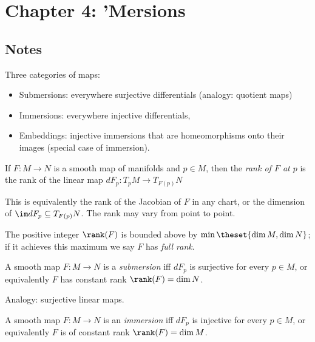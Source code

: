 \hypertarget{chapter-4-mersions}{%
\section{Chapter 4: 'Mersions}\label{chapter-4-mersions}}

\hypertarget{notes-2}{%
\subsection{Notes}\label{notes-2}}

Three categories of maps:

\begin{itemize}
\tightlist
\item
  Submersions: everywhere surjective differentials (analogy: quotient
  maps)
\item
  Immersions: everywhere injective differentials,
\item
  Embeddings: injective immersions that are homeomorphisms onto their
  images (special case of immersion).
\end{itemize}

\begin{definition}[Rank]

If \(F:M \to N\) is a smooth map of manifolds and \(p\in M\), then the
\emph{rank of \(F\) at \(p\)} is the rank of the linear map
\(dF_p: T_p M \to T_{F(p)} N\)

\end{definition}

This is equivalently the rank of the Jacobian of \(F\) in any chart, or
the dimension of \(\im dF_p \subseteq T_{F(p)}N\). The rank may vary
from point to point.

The positive integer \(\rank(F)\) is bounded above by
\(\min \theset{\dim M, \dim N}\); if it achieves this maximum we say
\(F\) has \emph{full rank}.

\begin{definition}[Submersion]

A smooth map \(F:M\to N\) is a \emph{submersion} iff \(dF_p\) is
surjective for every \(p\in M\), or equivalently \(F\) has constant rank
\(\rank(F) = \dim N\).

\end{definition}

Analogy: surjective linear maps.

\begin{definition}[Immersion]

A smooth map \(F:M\to N\) is an \emph{immersion} iff \(dF_p\) is
injective for every \(p\in M\), or equivalently \(F\) is of constant
rank \(\rank(F) = \dim M\).

\end{definition}

